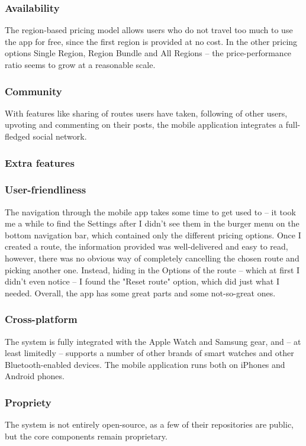 \subsubsection*{Availability}
The region-based pricing model allows users who do not travel too much to use the app for free,
since the first region is provided at no cost.
In the other pricing options Single Region, Region Bundle and All Regions -- the price-performance ratio seems to grow at a reasonable scale.
\subsubsection*{Community}
With features like sharing of routes users have taken, following of other users, upvoting and commenting on their posts, the mobile application integrates a full-fledged social network.
\subsubsection*{Extra features}

\subsubsection*{User-friendliness}
The navigation through the mobile app takes some time to get used to -- it took me a while to find the Settings after I didn't see them in the burger menu on the bottom navigation bar, which contained only the different pricing options.
Once I created a route, the information provided was well-delivered and easy to read, however, there was no obvious way of completely cancelling the chosen route and picking another one.
Instead, hiding in the Options of the route -- which at first I didn't even notice -- I found the "Reset route" option, which did just what I needed.
Overall, the app has some great parts and some not-so-great ones.
\subsubsection*{Cross-platform}
The system is fully integrated with the Apple Watch and Samsung gear, and -- at least limitedly -- supports a number of other brands of smart watches and other Bluetooth-enabled devices.
The mobile application runs both on iPhones and Android phones.
\subsubsection*{Propriety}
The system is not entirely open-source, as a few of their repositories are public, but the core components remain proprietary. 

